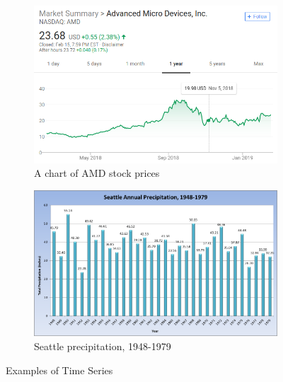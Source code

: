 \documentclass[oneside,12pt,openany]{book}
\begin{document}
	\begin{figure}[!ht]
		\centering
		\begin{subfigure}[b]{.45\textwidth}
			\includegraphics[width=\textwidth]{images/AMDChart.png}
			\caption{A chart of AMD stock prices}
			\label{fig:AMDChart}
		\end{subfigure}
		\begin{subfigure}[b]{.45\textwidth}
			\includegraphics[width=\textwidth]{images/SeattleRainfall.png}
			\caption{Seattle precipitation, 1948-1979}
			\label{fig:SeattlePrecip}
		\end{subfigure}
		\caption[Examples of Time Series]{Examples of Time Series \footnotemark}
		\label{fig:TimeSeriesExamples}
			
	\end{figure}
\end{document}
